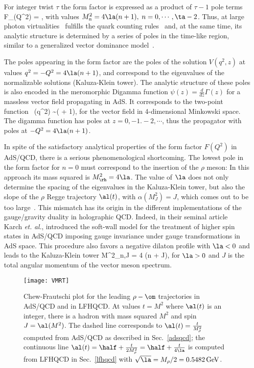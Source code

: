 \documentclass[aps,prd,preprint,groupedaddress]{revtex4-1}
\begin{document}
For integer  twist $\tau$ the form factor  is expressed as a product of $\tau - 1$ pole terms~\cite{Brodsky:2007hb}
\beq\label{Ftau}
 F_\tau(Q^2) =   ,
\enq
with values $M_n^2 = 4  \la  (n+1), \; n=0, \cdots, {\ta-2}$. Thus,  at large photon virtualities~  fulfills the quark counting rules~\cite{Brodsky:1973kr, Matveev:ra} and, at the same time, its analytic structure is determined by a series of poles in the time-like region, similar to a generalized vector dominance model~\cite{Sakurai:1960ju}.

The poles appearing in the form factor  are the poles of the solution $V(q^2,z)$ at values  $q^2 = - Q^2= 4  \la  (n+1)$, and correspond to the eigenvalues of the normalizable solutions (Kaluza-Klein tower). The analytic structure of these poles is also encoded in the meromorphic Digamma function $\psi(z) = \frac{d}{dz} \Gamma(z)$ for a massless vector field propagating in AdS. It corresponds to the two-point function~\cite{Brodsky:2014yha}   
\beq
\Si(q^2) \sim \psi\left( + 1\right),
\enq
for the vector field in 4-dimensional  Minkowski space. The digamma function has poles at $z = 0, - 1. -2, \cdots$, thus the propagator with poles at $- Q^2 = 4 \la (n + 1)$.


In spite of the satisfactory analytical properties of the form factor $F(Q^2)$ in AdS/QCD, there is a serious phenomenological shortcoming. The lowest pole in the form factor for $n = 0$ must correspond to the insertion of the $\rho$ meson:  In this approach its mass squared is  $M_\rh^2= 4 \la$. The value of $\la$ does not only determine the spacing of the eigenvalues in the Kaluza-Klein tower, but also the slope of the $\rho$ Regge trajectory $\al(t)$, with $\alpha(M_J^2) = J$,  which comes out to be too large~\cite{deTeramond:2010ge}. This mismatch has its origin in the different implementations of the gauge/gravity duality in holographic QCD. Indeed, in their seminal article~\cite{Karch:2006pv} Karch {\it et. al.}, introduced the soft-wall model for the treatment of higher spin states in AdS/QCD imposing gauge invariance under gauge transformations in AdS space. This procedure also favors a negative dilaton profile with $\la <0$ and leads to the Kaluza-Klein tower
\beq {}
M^2_{n,J} = 4 \la (n + J),
\enq
for $\la > 0$ and  $J$ is the total angular momentum of the vector meson spectrum.


\begin{figure}[ht]
\bec
\texttt{[image: VMRT]} 
\enc
\caption{ Chew-Frautschi plot for the leading $\rho-\om$ trajectories in AdS/QCD and in LFHQCD. At values $t=M^2$ where $\al(t)$ is an integer, there is a hadron with mass squared $M^2$ and spin $J= \al(M^2)$. The dashed line corresponds to $\al(t) = \frac{t}{M_\rho^2}$ computed from AdS/QCD as described in Sec.~\ref{adsqcd}; the continuous line  $\al(t) = \half + \frac{t}{2 M_\rho^2} = \half + \frac{t}{4 \la}$ is computed from LFHQCD in Sec.~\ref{lfhqcd} with $\sqrt{\la} = M_\rho/2 = 0.5482 \, {\rm GeV}$.}
\end{figure}
\end{document}
